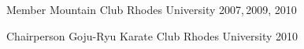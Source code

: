 


\begin{cvhonors}


\cvhonor
{Member} %
{Mountain Club} %
{Rhodes University} %
{2007,\,2009, 2010} %
    

\cvhonor
{Chairperson} %
{Goju-Ryu Karate Club} %
{Rhodes University} %
{2010} %
    

\end{cvhonors}